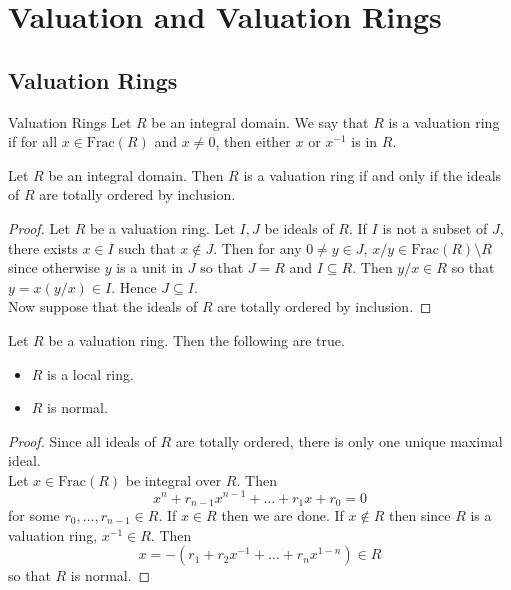\documentclass[a4paper]{article}
\begin{document}
\pagebreak
\section{Valuation and Valuation Rings}
\subsection{Valuation Rings}
\begin{defn}{Valuation Rings}{} Let $R$ be an integral domain. We say that $R$ is a valuation ring if for all $x\in\text{Frac}(R)$ and $x\neq 0$, then either $x$ or $x^{-1}$ is in $R$. 
\end{defn}

\begin{lmm}{}{} Let $R$ be an integral domain. Then $R$ is a valuation ring if and only if the ideals of $R$ are totally ordered by inclusion. 
\begin{proof}
Let $R$ be a valuation ring. Let $I,J$ be ideals of $R$. If $I$ is not a subset of $J$, there exists $x\in I$ such that $x\notin J$. Then for any $0\neq y\in J$, $x/y\in\text{Frac}(R)\setminus R$ since otherwise $y$ is a unit in $J$ so that $J=R$ and $I\subseteq R$. Then $y/x\in R$ so that $y=x(y/x)\in I$. Hence $J\subseteq I$. \\

Now suppose that the ideals of $R$ are totally ordered by inclusion. 
\end{proof}
\end{lmm}

\begin{lmm}{}{} Let $R$ be a valuation ring. Then the following are true. 
\begin{itemize}
\item $R$ is a local ring. 
\item $R$ is normal. 
\end{itemize} 
\begin{proof}
Since all ideals of $R$ are totally ordered, there is only one unique maximal ideal. \\

Let $x\in\text{Frac}(R)$ be integral over $R$. Then $$x^n+r_{n-1}x^{n-1}+\dots+r_1x+r_0=0$$ for some $r_0,\dots,r_{n-1}\in R$. If $x\in R$ then we are done. If $x\notin R$ then since $R$ is a valuation ring, $x^{-1}\in R$. Then $$x=-(r_1+r_2x^{-1}+\dots+r_nx^{1-n})\in R$$ so that $R$ is normal. 
\end{proof}
\end{lmm}
\end{document}

